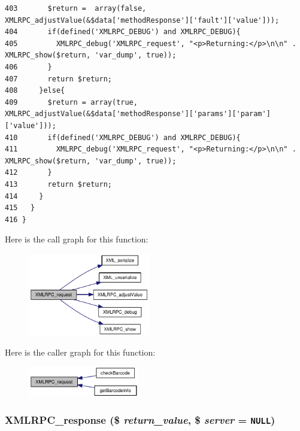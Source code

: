 \begin{Code}
\begin{verbatim}
403       $return =  array(false, XMLRPC_adjustValue(&$data['methodResponse']['fault']['value']));
404       if(defined('XMLRPC_DEBUG') and XMLRPC_DEBUG){
405         XMLRPC_debug('XMLRPC_request', "<p>Returning:</p>\n\n" . XMLRPC_show($return, 'var_dump', true));
406       }
407       return $return;
408     }else{
409       $return = array(true, XMLRPC_adjustValue(&$data['methodResponse']['params']['param']['value']));
410       if(defined('XMLRPC_DEBUG') and XMLRPC_DEBUG){
411         XMLRPC_debug('XMLRPC_request', "<p>Returning:</p>\n\n" . XMLRPC_show($return, 'var_dump', true));
412       }
413       return $return;
414     }
415   }
416 }
\end{verbatim}
\end{Code}




Here is the call graph for this function:\nopagebreak
\begin{figure}[H]
\begin{center}
\leavevmode
\includegraphics[width=151pt]{xmlrpc_8inc_3a98b6984b8ca01752d1aa9a267526a3_cgraph}
\end{center}
\end{figure}


Here is the caller graph for this function:\nopagebreak
\begin{figure}[H]
\begin{center}
\leavevmode
\includegraphics[width=137pt]{xmlrpc_8inc_3a98b6984b8ca01752d1aa9a267526a3_icgraph}
\end{center}
\end{figure}
\hypertarget{xmlrpc_8inc_c736d378caaccdd0726ea1080d1f526f}{
\subsubsection{\setlength{\rightskip}{0pt plus 5cm}XMLRPC\_\-response (\$ {\em return\_\-value}, \$ {\em server} = {\tt NULL})}}
\label{xmlrpc_8inc_c736d378caaccdd0726ea1080d1f526f}




